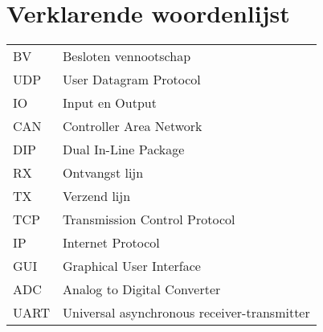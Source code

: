 \chapter*{Verklarende woordenlijst}
\begin{table}[h!]
	\begin{tabular}{ll}
	BV	& Besloten vennootschap \\
	UDP & User Datagram Protocol \\
	IO	& Input en Output			\\
	CAN	& Controller Area Network \\
	DIP	& Dual In-Line Package \\
	RX	& Ontvangst lijn \\
	TX	& Verzend lijn \\
	TCP	& Transmission Control Protocol \\
	IP	& Internet Protocol \\
	GUI	& Graphical User Interface \\
	ADC	& Analog to Digital Converter \\
	UART & Universal asynchronous receiver-transmitter \\                  
	\end{tabular}
	\label{tab:woordenlijst}
\end{table}
